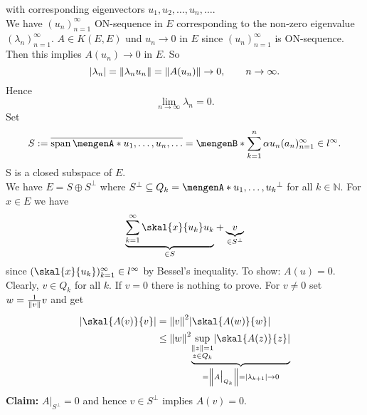\begin{beweis}
\begin{description}
\[		\]
		with corresponding eigenvectors $u_1,u_2, \dots,u_n, \dots$. \\
		We have $(u_n)_{n=1}^{\infty}$ ON-sequence in $E$ corresponding to the non-zero eigenvalue $(\lambda_n)_{n=1}^{\infty}$. $A \in K(E,E)$ und $u_n \to 0$ in $E$ since 
		$(u_n)_{n=1}^{\infty}$ is ON-sequence. \\
		Then this implies $A(u_n) \to 0$ in $E$. So \[
			\abs{\lambda_n} = \norm{\lambda_n u_n} = \norm{A(u_n)} \to 0, \qquad n \to \infty.
		\]
		Hence \[
			\lim_{n \to \infty} \lambda_n = 0.
		\]
		Set 
		\[
			S := \overline{\spn\set{u_1, \dots,u_n, \dots}} = \set[\sum_{k=1}^{n}\alpha u_n]{ (a_n)_{n=1}^{\infty} \in l^\infty}.
		\]
		S is a closed subspace of $E$. \\ We have $E = S \oplus S^{\perp}$ where $S^{\perp} \subseteq Q_k = \set{u_1,\dots,u_k}^{\perp}$ for all $k \in \mathbb{N}$.
		For $x \in E$ we have
		\[
			\underset{\in S}{\underbrace{\sum_{k=1}^{\infty} \skal{x}{u_k}u_k}} + \underset{\in S^{\perp}}{\underbrace{v}}
		\]
		since $(\skal{x}{u_k})_{k=1}^{\infty} \in l^\infty$ by Bessel's inequality. 
		To show: $A(u)=0$. Clearly, $v \in Q_k$ for all $k$. If $v = 0$ there is nothing to prove. For $v \neq 0$ set $w= \frac{1}{\norm{v}}v$ and get
		\begin{align*}
			\abs{\skal{A(v)}{v}} &= \norm{v}^2 \abs{ \skal{A(w)}{w}} \\
			&\leq \norm{w}^2 \underset{= \norm{A  \big|_{Q_k}^{}} = \abs{\lambda_{k+1}} \to 0}{\underbrace{\sup_{ \substack{\norm{z}=1 \\ z \in Q_k}} \abs{\skal{A(z)}{z}}}}
		\end{align*}
		\textbf{Claim:} \text{    }$A  \big|_{S^{\perp}}^{} = 0$ and hence $v \in S^{\perp}$ implies $A(v) = 0$.
	\end{description}
\end{beweis}

